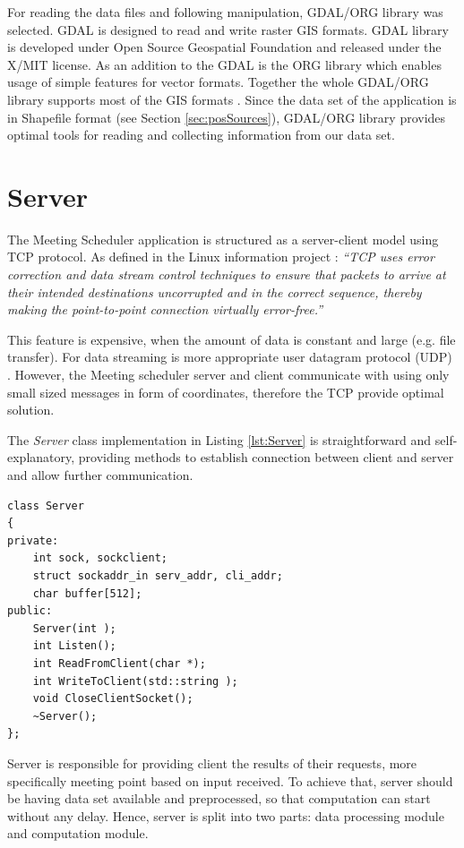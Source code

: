 \documentclass[thesis=M,english]{FITthesis}[2012/10/20]
\begin{document}
For reading the data files and following manipulation, GDAL/ORG library was selected. GDAL is designed to read and write raster GIS formats. GDAL library is developed under Open Source Geospatial Foundation and released under the X/MIT license\cite{GDAL17}. 
As an addition to the GDAL is the ORG library which enables usage of simple features for vector formats. Together the whole GDAL/ORG library supports most of the GIS formats \cite{GDAL117}. %
Since the data set of the application is in Shapefile format (see Section \ref{sec:posSources}), GDAL/ORG library provides optimal tools for reading and collecting information from our data set.

\section{Server}
\label{sec:server}
The Meeting Scheduler application is structured as a server-client model using TCP protocol. As defined in the Linux information project \cite{TCP17}:  \textit{``TCP uses error correction and data stream control techniques to ensure that packets to arrive at their intended destinations uncorrupted and in the correct sequence, thereby making the point-to-point connection virtually error-free.''} 

This feature is expensive, when the amount of data is constant and large (e.g. file transfer). For data streaming is more appropriate user datagram protocol (UDP) \cite{Kurose10}.
However, the Meeting scheduler server and client communicate with using only small sized messages in form of coordinates, therefore the TCP provide optimal solution. 

The \textit{Server} class implementation in Listing \ref{lst:Server} is straightforward and self-explanatory, providing methods to establish connection between client and server and allow further communication.

\begin{lstlisting}[frame=single, caption={\texttt{Server} class}, label={lst:Server}]
class Server
{
private:
    int sock, sockclient;
	struct sockaddr_in serv_addr, cli_addr;
    char buffer[512];
public:
    Server(int );
    int Listen();
    int ReadFromClient(char *);
    int WriteToClient(std::string );
    void CloseClientSocket();
    ~Server();
};
\end{lstlisting}

Server is responsible for providing client the results of their requests, more specifically meeting point based on input received. To achieve that, server should be having data set available and preprocessed, so that computation can start without any delay. Hence, server is split into two parts: data processing module and computation module.
\end{document}

